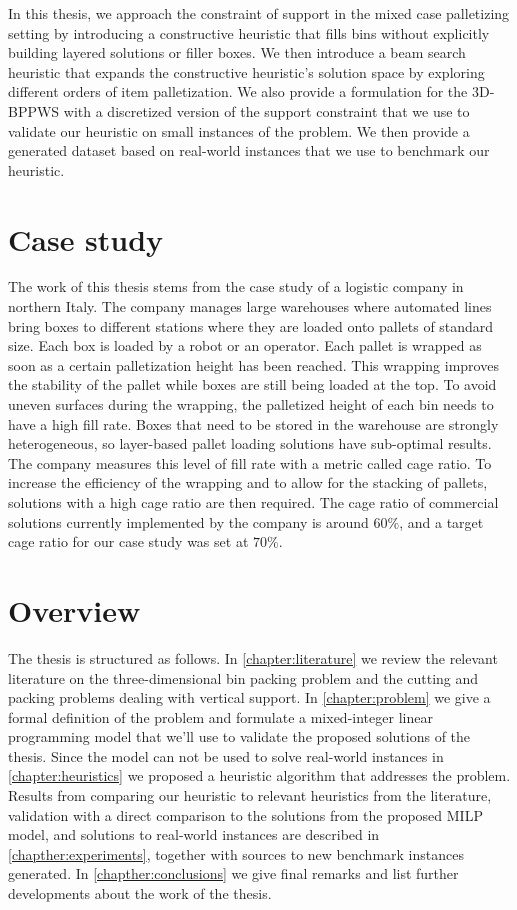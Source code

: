 In this thesis, we approach the constraint of support in the mixed case palletizing setting by introducing a constructive heuristic that fills bins without explicitly building layered solutions or filler boxes.
We then introduce a beam search heuristic that expands the constructive heuristic's solution space by exploring different orders of item palletization.
We also provide a formulation for the 3D-BPPWS with a discretized version of the support constraint that we use to validate our heuristic on small instances of the problem.
We then provide a generated dataset based on real-world instances that we use to benchmark our heuristic.

\section{Case study}
\label{sec:intro:case_study}%
The work of this thesis stems from the case study of a logistic company in northern Italy.
The company manages large warehouses where automated lines bring boxes to different stations where they are loaded onto pallets of standard size.
Each box is loaded by a robot or an operator. Each pallet is wrapped as soon as a certain palletization height has been reached.
This wrapping improves the stability of the pallet while boxes are still being loaded at the top. To avoid uneven surfaces during the wrapping, the palletized height of each bin needs to have a high fill rate.
Boxes that need to be stored in the warehouse are strongly heterogeneous, so layer-based pallet loading solutions have sub-optimal results.
The company measures this level of fill rate with a metric called cage ratio.
To increase the efficiency of the wrapping and to allow for the stacking of pallets, solutions with a high cage ratio are then required.
The cage ratio of commercial solutions currently implemented by the company is around $60\%$, and a target cage ratio for our case study was set at $70\%$.

\newpage
\section{Overview}
\label{sec:intro:overview}%
The thesis is structured as follows.
In \cref{chapter:literature} we review the relevant literature on the three-dimensional bin packing problem and the cutting and packing problems dealing with vertical support.
In \cref{chapter:problem} we give a formal definition of the problem and formulate a mixed-integer linear programming model that we'll use to validate the proposed solutions of the thesis.
Since the model can not be used to solve real-world instances in \cref{chapter:heuristics} we proposed a heuristic algorithm that addresses the problem.
Results from comparing our heuristic to relevant heuristics from the literature, validation with a direct comparison to the solutions from the proposed MILP model, and solutions to real-world instances are described in \cref{chapther:experiments}, together with sources to new benchmark instances generated.
In \cref{chapther:conclusions} we give final remarks and list further developments about the work of the thesis.